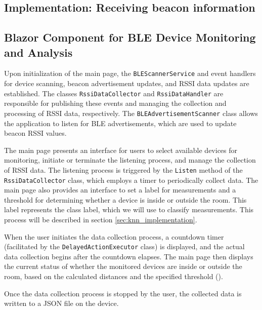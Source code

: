 \subsection{Implementation: Receiving beacon information}\label{sec:ble_implementation}

\subsection{Blazor Component for BLE Device Monitoring and Analysis}
Upon initialization of the main page, the \texttt{BLEScannerService} and event handlers for device scanning, beacon advertisement updates, and RSSI data updates are established. 
The classes \texttt{RssiDataCollector} and \texttt{RssiDataHandler} are responsible for publishing these events and managing the collection and processing of RSSI data, respectively.
The \texttt{BLEAdvertisementScanner} class allows the application to listen for BLE advertisements, which are used to update beacon RSSI values.

The main page presents an interface for users to select available devices for monitoring, initiate or terminate the listening process, and manage the collection of RSSI data. 
The listening process is triggered by the \texttt{Listen} method of the \texttt{RssiDataCollector} class, which employs a timer to periodically collect data. 
The main page also provides an interface to set a label for measurements and a threshold for determining whether a device is inside or outside the room. 
This label represents the class label, which we will use to classify measurements. 
This process will be described in section \ref{sec:knn_implementation}.

When the user initiates the data collection process, a countdown timer (facilitated by the \texttt{DelayedActionExecutor} class) is displayed, and the actual data collection begins after the countdown elapses.
The main page then displays the current status of whether the monitored devices are inside or outside the room, based on the calculated distances and the specified threshold ().

Once the data collection process is stopped by the user, the collected data is written to a JSON file on the device.


